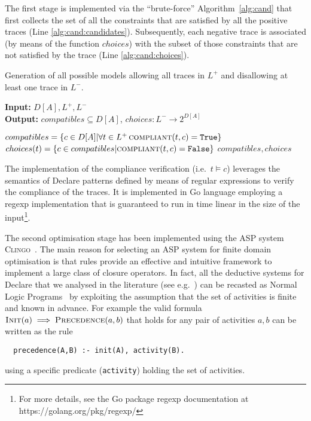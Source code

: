 The first stage is implemented via the ``brute-force'' Algorithm~\ref{alg:cand} that first collects the set of all the constraints that are satisfied by all the positive traces (Line \ref{alg:cand:candidates}). Subsequently, each negative trace is associated (by means of the function ${choices}$) with the subset of those constraints that are not satisfied by the trace  (Line \ref{alg:cand:choices}).
%
\begin{algorithm}
    \caption{Generation of all possible models allowing all traces in $L^+$ and disallowing at least one trace in $L^-$.}
    \label{alg:cand}
    \textbf{Input:}  $D[A], L^+, L^-$\\
    \textbf{Output:} ${compatibles} \subseteq D[A]$, ${choices} : L^- \rightarrow 2^{D[A]}$
	\begin{algorithmic}[1] 
   	\State ${compatibles}= \{c \in D[A] | \forall t \in L^+\, \Call{compliant}{t,c} = \texttt{True}\}$ \label{alg:cand:candidates}
		\State ${choices}(t) = \{c \in {compatibles} | \Call{compliant}{t,c} = \texttt{False}\}$\label{alg:cand:choices}
	\EndFor
	\State \Return ${compatibles}, {choices}$
    \EndProcedure
    \end{algorithmic}
\end{algorithm}

The implementation of the compliance verification  (i.e.\ $t\models c$) leverages the semantics of Declare patterns defined by means of regular expressions \cite{2017-DiCiccio} to verify the compliance of the traces. It is implemented in Go language employing a regexp implementation that is guaranteed to run in time linear in the size of the input\footnote{For more details, see the Go package regexp documentation at https://golang.org/pkg/regexp/}. 

\lstset{language=Prolog}

The second optimisation stage has been implemented using the \ac{ASP} system \textsc{Clingo}~\cite{DBLP:journals/corr/GebserKKS14}. The main reason for selecting an \ac{ASP} system for finite domain optimisation is that rules provide an effective and intuitive framework to implement a large class of closure operators. In fact, all the deductive systems for Declare that we analysed in the literature (see e.g.~\cite{2016-Bernardi,2017-DiCiccio}) can be recasted as Normal Logic Programs~\cite{2008-Lifschitz} by exploiting the assumption that the set of activities is finite and known in advance.
%
For example the valid formula $\textsc{Init}(a)\implies\textsc{Precedence}(a,b)$ that holds for any pair of activities $a, b$ can be written as the rule
\begin{lstlisting}
  precedence(A,B) :- init(A), activity(B).
\end{lstlisting}
using a specific predicate (\lstinline{activity}) holding the set of activities.

